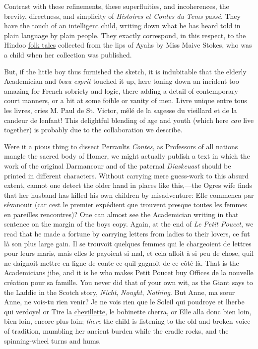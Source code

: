 \documentclass[14pt,a4paper]{memoir}
\newcommand{\ul}[1]{\uline{#1}}
\begin{document}
{Contrast with these refinements, these superfluities, and incoherences,
the brevity, directness, and simplicity of \emph{Histoires et Contes du
Tems passé}. They have the touch of an intelligent child, writing down
what he has heard told in plain language by plain people. They exactly
correspond, in this respect, to the Hindoo \ul{folk tales} collected
from the lips of Ayahs by Miss Maive Stokes, who was a child when her
collection was published.

But, if the little boy thus furnished the sketch, it is indubitable that
the elderly Academician and \emph{beau esprit} touched it up, here
toning down an incident too amazing for French sobriety and logic, there
adding a detail of contemporary court manners, or a hit at some foible
or vanity of men. \textquotesingle Livre unique entre tous les
livres,\textquotesingle{} cries M. Paul de St. Victor,
\textquotesingle mêlé de la sagesse du vieillard et de la candeur de
l\textquotesingle enfant!\textquotesingle{} This delightful blending of
age and youth (which here \emph{can} \textquotesingle live
together\textquotesingle) is probably due to the collaboration we
describe.

Were it a pious thing to dissect Perrault\textquotesingle s
\emph{Contes}, as Professors of all nations mangle the sacred body of
Homer, we might actually publish a text in which the work of the
original Darmancour and of the paternal \emph{Diaskeuast} should be
printed in different characters. Without carrying mere guess-work to
this absurd extent, cannot one detect the older hand in places like
this,---the Ogre\textquotesingle s wife finds that her husband has
killed his own children by misadventure: \textquotesingle Elle commenca
par s\textquotesingle évanouir (car c\textquotesingle est le premier
expédient que trouvent presque toutes les femmes en pareilles
rencontres)\textquotesingle? One can almost see the Academician writing
in that sentence on the margin of the boy\textquotesingle s copy. Again,
at the end of \emph{Le Petit Poucet}, we read that he made a fortune by
carrying letters from ladies to their lovers, \textquotesingle ce fut là
son plus large gain. Il se trouvoit quelques femmes qui le chargeoient
de lettres pour leurs maris, mais elles le payoient si mal, et cela
alloit à si peu de chose, qu\textquotesingle il ne daignoit mettre en
ligne de conte ce qu\textquotesingle il gagnoit de ce
côté-là.\textquotesingle{} That is the Academician\textquotesingle s
jibe, and it is he who makes Petit Poucet buy Offices
\textquotesingle de la nouvelle création pour sa
famille.\textquotesingle{} \textquotesingle You never did that of your
own wit,\textquotesingle{} as the Giant says to the Laddie in the Scotch
story, \emph{Nicht}, \emph{Nought}, \emph{Nothing}. But
\textquotesingle Anne, ma sœur Anne, ne vois-tu rien
venir?\textquotesingle{} \textquotesingle Je ne vois rien que le Soleil
qui poudroye et l\textquotesingle herbe qui verdoye!\textquotesingle{}
or \textquotesingle Tire la \ul{chevillette}, le bobinette
cherra,\textquotesingle{} or \textquotesingle Elle alla donc bien loin,
bien loin, encore plus loin\textquotesingle; \emph{there} the child is
listening to the old and broken voice of tradition, mumbling her ancient
burden while the cradle rocks, and the spinning-wheel turns and hums.

}
\end{document}
